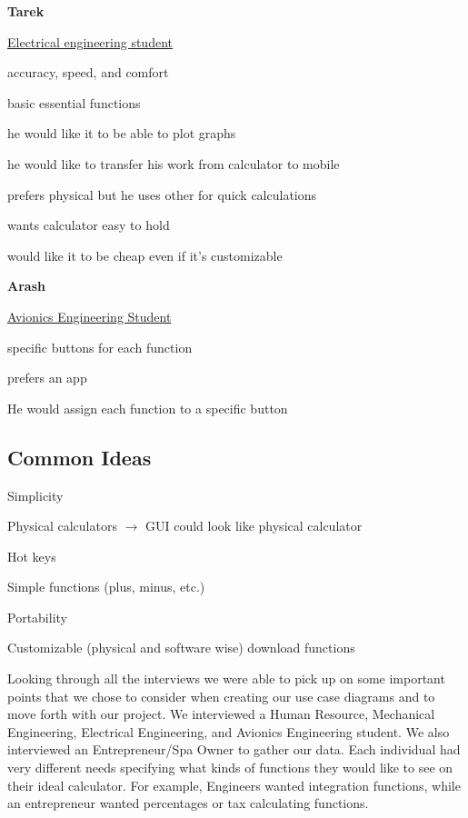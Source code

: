 \documentclass[a4paper, 12pt]{article}
\begin{document}
\textbf{Tarek}

\underline{Electrical engineering student}

\begin{compactitem}
\item accuracy, speed, and comfort
\item basic essential functions
\item he would like it to be able to plot graphs 
\item he would like to transfer his work from calculator to mobile
\item prefers physical but he uses other for quick calculations
\item wants calculator easy to hold
\item would like it to be cheap even if it’s customizable
\end{compactitem}
\bigskip

\textbf{Arash}

\underline{Avionics Engineering Student}

\begin{compactitem}
\item specific buttons for each function
\item prefers an app 
\item He would assign each function to a specific button
\end{compactitem}


\subsection{Common Ideas}
\begin{compactitem}
\item Simplicity 
\item Physical calculators $\rightarrow$ GUI could look like physical calculator
\item Hot keys 
\item Simple functions (plus, minus, etc.) 
\item Portability 
\item Customizable (physical and software wise)  download functions 
\end{compactitem}

\vspace{5mm}

Looking through all the interviews we were able to pick up on some important points that we chose to consider when creating our use case diagrams and to move forth with our project. We interviewed a Human Resource, Mechanical Engineering, Electrical Engineering, and Avionics Engineering student. We also interviewed an Entrepreneur/Spa Owner to gather our data. Each individual had very different needs specifying what kinds of functions they would like to see on their ideal calculator. For example, Engineers wanted integration functions, while an entrepreneur wanted percentages or tax calculating functions. \\
\end{document}
